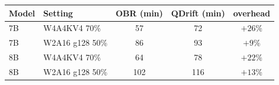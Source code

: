 \begin{tabular}{llccc}
\toprule
Model & Setting & OBR (min) & QDrift (min) & overhead \\
\midrule
7B & W4A4KV4 70\% & 57 & 72 & $+26\%$ \\
7B & W2A16 g128 50\% & 86 & 93 & $+9\%$ \\
8B & W4A4KV4 70\% & 64 & 78 & $+22\%$ \\
8B & W2A16 g128 50\% & 102 & 116 & $+13\%$ \\
\bottomrule
\end{tabular}
